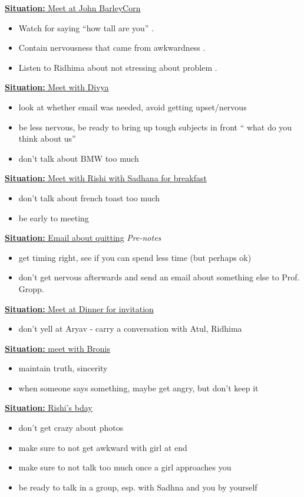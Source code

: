 \documentclass[11pt]{article}
\newcommand{\newSituation}[1]{\underline{\textbf{Situation:} #1} }
\begin{document}
\newSituation{Meet at John BarleyCorn} 
\begin{itemize} 
\item Watch for saying ``how tall are you'' . 
\item Contain nervousness that came from awkwardness . 
\item Listen to Ridhima about not stressing about problem . 
\end{itemize} 

\newSituation{Meet with Divya} 
\begin{itemize} 
\item look at whether email was needed, avoid getting upset/nervous 
\item be less nervous, be ready to bring up tough subjects in front `` what do you think about us'' 
\item don't talk about BMW too much 
\end{itemize} 

\newSituation{Meet with Rishi with Sadhana for breakfast} 
\begin{itemize} 
\item don't talk about french toast too much 
\item be early to meeting
\end{itemize} 

\newSituation{Email about quitting}
\textit{Pre-notes}
\begin{itemize}
\item get timing right, see if you can spend less time (but perhaps ok)
\item don't get nervous afterwards and send an email about something else to Prof. Gropp. 
\end{itemize}

\newSituation{Meet at Dinner for invitation} 
\begin{itemize} 
\item don't yell at Aryav - carry a conversation with Atul, Ridhima  
\end{itemize} 

\newSituation{meet with Bronis} 
\begin{itemize} 
\item maintain truth, sincerity 
\item when someone says something, maybe get angry, but don't keep it 
\end{itemize} 

\newSituation{Rishi's bday}
\begin{itemize} 
\item don't get crazy about photos 
\item make sure to not get awkward with girl at end 
\item make sure to not talk too much once a girl approaches you 
\item be ready to talk in a group, esp. with Sadhna and you by yourself 
\end{itemize}
\end{document}

